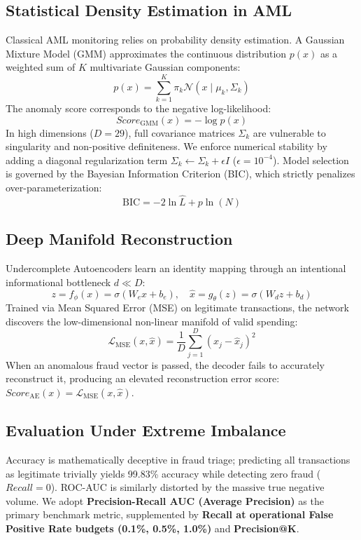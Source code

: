 \documentclass[conference]{IEEEtran}
\begin{document}
\subsection{Statistical Density Estimation in AML}
Classical AML monitoring relies on probability density estimation. A Gaussian Mixture Model (GMM) approximates the continuous distribution $p(x)$ as a weighted sum of $K$ multivariate Gaussian components:
\begin{equation}
p(x) = \sum_{k=1}^K \pi_k \mathcal{N}(x \mid \mu_k, \Sigma_k)
\end{equation}
The anomaly score corresponds to the negative log-likelihood:
\begin{equation}
Score_{\text{GMM}}(x) = -\log p(x)
\end{equation}
In high dimensions ($D = 29$), full covariance matrices $\Sigma_k$ are vulnerable to singularity and non-positive definiteness. We enforce numerical stability by adding a diagonal regularization term $\Sigma_k \leftarrow \Sigma_k + \epsilon I$ ($\epsilon = 10^{-4}$). Model selection is governed by the Bayesian Information Criterion (BIC), which strictly penalizes over-parameterization:
\begin{equation}
\text{BIC} = -2 \ln \hat{L} + p \ln(N)
\end{equation}

\subsection{Deep Manifold Reconstruction}
Undercomplete Autoencoders learn an identity mapping through an intentional informational bottleneck $d \ll D$:
\begin{equation}
z = f_\phi(x) = \sigma(W_e x + b_e), \quad \hat{x} = g_\theta(z) = \sigma(W_d z + b_d)
\end{equation}
Trained via Mean Squared Error (MSE) on legitimate transactions, the network discovers the low-dimensional non-linear manifold of valid spending:
\begin{equation}
\mathcal{L}_{\text{MSE}}(x, \hat{x}) = \frac{1}{D} \sum_{j=1}^D (x_j - \hat{x}_j)^2
\end{equation}
When an anomalous fraud vector is passed, the decoder fails to accurately reconstruct it, producing an elevated reconstruction error score: $Score_{\text{AE}}(x) = \mathcal{L}_{\text{MSE}}(x, \hat{x})$.

\subsection{Evaluation Under Extreme Imbalance}
Accuracy is mathematically deceptive in fraud triage; predicting all transactions as legitimate trivially yields 99.83\% accuracy while detecting zero fraud ($Recall = 0$). ROC-AUC is similarly distorted by the massive true negative volume. We adopt \textbf{Precision-Recall AUC (Average Precision)} as the primary benchmark metric, supplemented by \textbf{Recall at operational False Positive Rate budgets (0.1\%, 0.5\%, 1.0\%)} and \textbf{Precision@K}.
\end{document}
